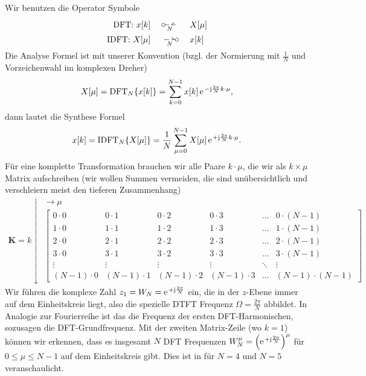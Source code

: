 Wir benutzen die Operator Symbole
\begin{align}
\text{DFT: }x[k] &\quad\mydft\quad X[\mu]\\
\text{IDFT: }X[\mu] &\quad\myDFT\quad x[k]
\end{align}
%
Die Analyse Formel ist mit unserer Konvention
(bzgl. der Normierung mit $\frac{1}{N}$ und Vorzeichenwahl im komplexen Dreher)
\begin{align}
X[\mu] = \mathrm{DFT}_N\{x[k]\} = \sum_{k=0}^{N-1} x[k] \, \e^{-\im\frac{2\pi}{N} k \cdot \mu},
\end{align}
dann lautet die Synthese Formel
\begin{align}
x[k] = \mathrm{IDFT}_N\{X[\mu]\} = \frac{1}{N} \sum_{\mu=0}^{N-1} X[\mu] \, \e^{+\im\frac{2\pi}{N} k \cdot \mu}.
\end{align}
%
Für eine komplette Transformation brauchen wir alle Paare $k \cdot \mu$,
die wir als $k \times \mu$ Matrix aufschreiben (wir wollen Summen vermeiden,
die sind unübersichtlich und verschleiern meist den tieferen Zusammenhang)
\begin{align}
\bm{K} =
k \downarrow
\substack{\rightarrow \mu\\
\begin{bmatrix}
0 \cdot 0 & 0 \cdot 1 & 0 \cdot 2 & 0 \cdot 3 & \dots & 0 \cdot (N-1)\\
1 \cdot 0 & 1 \cdot 1 & 1 \cdot 2 & 1 \cdot 3 & \dots & 1 \cdot (N-1)\\
2 \cdot 0 & 2 \cdot 1 & 2 \cdot 2 & 2 \cdot 3 & \dots & 2 \cdot (N-1)\\
3 \cdot 0 & 3 \cdot 1 & 3 \cdot 2 & 3 \cdot 3 & \dots & 3 \cdot (N-1)\\
\vdots & \vdots & \vdots & \vdots & \ddots & \vdots\\
(N-1) \cdot 0 & (N-1) \cdot 1 & (N-1) \cdot 2 & (N-1) \cdot 3 & \dots &  (N-1) \cdot (N-1)
\end{bmatrix}
}
\end{align}
Wir führen die komplexe Zahl $z_1 = W_N = \e^{+\im\frac{2\pi}{N}}$ ein, die
in der $z$-Ebene immer auf dem Einheitskreis liegt, also die spezielle DTFT
Frequenz $\Omega = \frac{2\pi}{N}$ abbildet. In Analogie zur Fourierreihe ist
das die Frequenz der ersten DFT-Harmonischen, sozusagen die DFT-Grundfrequenz.
Mit der zweiten Matrix-Zeile (wo $k=1$) können wir erkennen,
dass es insgesamt $N$ DFT Frequenzen
$W_N^\mu=\left(\e^{+\im\frac{2\pi}{N}}\right)^\mu$ für $0\leq\mu\leq N-1$
auf dem Einheitskreis gibt.
%
Dies ist in  für $N=4$ und $N=5$ veranschaulicht.
